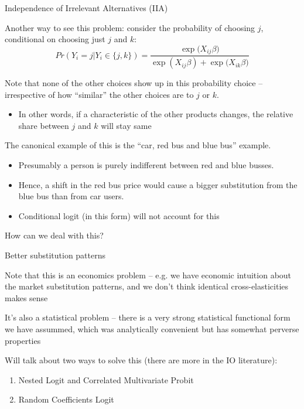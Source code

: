 \documentclass[notes,11pt, aspectratio=169]{beamer}
\newenvironment{wideitemize}{\itemize\addtolength{\itemsep}{10pt}}{\enditemize}
\begin{document}
\begin{frame}{Independence of Irrelevant Alternatives (IIA)}
  \begin{wideitemize}
  \item Another way to see this problem: consider the probability of
    choosing $j$, conditional on choosing just $j$ and $k$:
    $$Pr(Y_{i} = j | Y_{i} \in \{j,k\}) = \frac{\exp{(X_{ij}\beta})}{\exp{(X_{ij}\beta)} + \exp{(X_{ik}\beta})} $$
  \item Note that none of the other choices show up in this
    probability choice -- irrespective of how ``similar'' the other
    choices are to $j$ or $k$.
    \begin{itemize}
    \item In other words, if a characteristic of the other products changes,
      the relative share between $j$ and $k$ will stay same
    \end{itemize}
  \item The canonical example of this is the ``car, red bus and
    blue bus'' example.
    \begin{itemize}
    \item  Presumably a person is purely indifferent
      between red and blue busses.
    \item Hence, a shift in the red bus price would cause a bigger substitution from the blue bus than from car
      users.
    \item Conditional logit (in this form) will not account for this
    \end{itemize}
  \end{wideitemize}
\end{frame}


\begin{frame}{How can we deal with this?}
  \begin{wideitemize}
    \item Better substitution patterns

    \item Note that this is an economics problem -- e.g. we have
      economic intuition about the market substitution patterns, and
      we don't think identical cross-elasticities makes sense
    
    \item It's also a statistical problem -- there is a very strong
    statistical functional form we have assummed, which was
    analytically convenient but has somewhat perverse properties

    \item Will talk about two ways to solve this (there are more in the IO literature):
    \begin{enumerate}
    \item Nested Logit and Correlated Multivariate Probit
    \item Random Coefficients Logit
    \end{enumerate}
  \end{wideitemize}
\end{frame}
\end{document}
